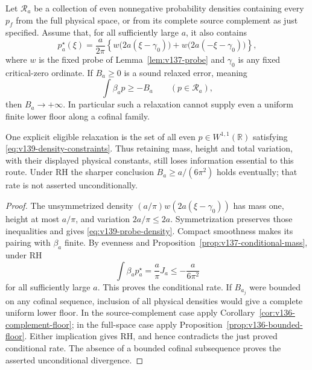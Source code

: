 \begin{theorem}
\label{thm:v139-probe-relaxation}
Let $\mathcal R_a$ be a collection of even nonnegative probability
densities containing every $p_f$ from the full physical space, or
from its complete source complement as just specified. Assume that,
for all sufficiently large $a$, it also contains
\begin{equation}\label{eq:v139-probe-density}
 p_a^\star(\xi)=\frac a{2\pi}
 \left\{w\bigl(2a(\xi-\gamma_0)\bigr)
       +w\bigl(2a(-\xi-\gamma_0)\bigr)\right\},
\end{equation}
where $w$ is the fixed probe of Lemma~\ref{lem:v137-probe} and
$\gamma_0$ is any fixed critical-zero ordinate. If $B_a\ge0$ is a
sound relaxed error, meaning
\begin{equation}\label{eq:v139-relaxed-error}
 \int\beta_a p\ge-B_a\qquad(p\in\mathcal R_a),
\end{equation}
then $B_a\to+\infty$. In particular such a relaxation cannot supply
even a uniform finite lower floor along a cofinal family.

One explicit eligible relaxation is the set of all even $p\in
W^{1,1}(\mathbb R)$ satisfying \eqref{eq:v139-density-constraints}.
Thus retaining mass, height and total variation, with their displayed
physical constants, still loses information essential to this route.
Under RH the sharper conclusion $B_a\ge a/(6\pi^2)$ holds eventually;
that rate is not asserted unconditionally.
\end{theorem}
\begin{proof}
The unsymmetrized density $(a/\pi)w(2a(\xi-\gamma_0))$ has mass one,
height at most $a/\pi$, and variation $2a/\pi\le2a$.
Symmetrization preserves those inequalities and gives
\eqref{eq:v139-probe-density}. Compact smoothness makes its pairing
with $\beta_a$ finite. By evenness and
Proposition~\ref{prop:v137-conditional-mass}, under RH
\[
 \int\beta_ap_a^\star=\frac a\pi J_a
       \le-\frac a{6\pi^2}
\]
for all sufficiently large $a$. This proves the conditional rate.
If $B_{a_j}$ were bounded on any cofinal sequence, inclusion of all
physical densities would give a complete uniform lower floor. In
the source-complement case apply
Corollary~\ref{cor:v136-complement-floor}; in the full-space case
apply Proposition~\ref{prop:v136-bounded-floor}. Either implication
gives RH, and hence contradicts the just proved conditional rate.
The absence of a bounded cofinal subsequence proves the asserted
unconditional divergence.
\end{proof}

